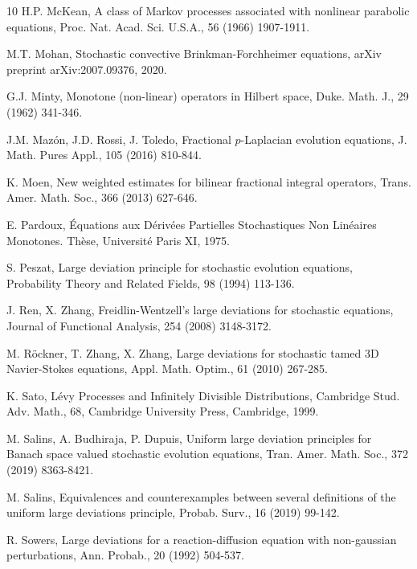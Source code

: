 \documentclass[11pt]{article}
\numberwithin{equation}{section}
\begin{document}
\begin{thebibliography}{10}
H.P. McKean, A class of Markov processes associated with nonlinear parabolic equations, Proc. Nat. Acad. Sci. U.S.A., 56 (1966) 1907-1911.


M.T. Mohan,
Stochastic convective Brinkman-Forchheimer
equations, arXiv preprint arXiv:2007.09376, 2020.

G.J. Minty, Monotone (non-linear) operators in Hilbert space, Duke. Math. J., 29 (1962)
341-346.

J.M. Maz\'{o}n, J.D. Rossi, J. Toledo, Fractional $p$-Laplacian evolution equations,  J. Math. Pures Appl., 105 (2016) 810-844.

K. Moen, New weighted estimates for bilinear fractional integral operators,  Trans. Amer. Math. Soc.,  366 (2013) 627-646.






 E. Pardoux, \'Equations aux D\'eriv\'ees Partielles Stochastiques Non Lin\'eaires Monotones. Th\`ese, Universit\'e Paris XI, 1975.


S. Peszat, Large deviation principle for stochastic evolution equations, Probability Theory and Related Fields, 98 (1994) 113-136.

 J. Ren, X. Zhang, Freidlin-Wentzell's large deviations for stochastic equations, Journal of
Functional Analysis, 254 (2008) 3148-3172.

M. R\"{o}ckner, T. Zhang, X. Zhang, Large deviations for stochastic tamed 3D Navier-Stokes
equations, Appl. Math. Optim., 61 (2010) 267-285.


K. Sato, L\'{e}vy Processes and Infinitely Divisible Distributions, Cambridge Stud. Adv. Math., 68, Cambridge University Press, Cambridge, 1999.

M. Salins, A. Budhiraja, P. Dupuis, Uniform large deviation principles for Banach space
valued stochastic evolution equations, Tran. Amer. Math. Soc., 372 (2019) 8363-8421.

M. Salins, Equivalences and counterexamples between several definitions of the uniform large
deviations principle, Probab. Surv., 16 (2019) 99-142.


 R. Sowers, Large deviations for a reaction-diffusion equation with non-gaussian
perturbations, Ann.
Probab., 20 (1992) 504-537.


\end{thebibliography}
\end{document}
